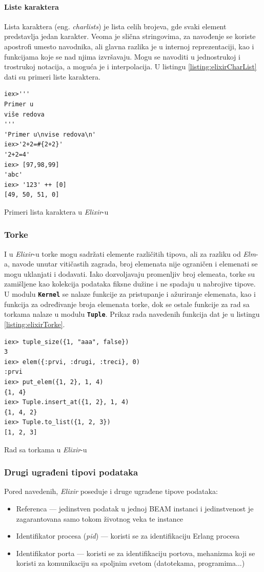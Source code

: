 \documentclass[12pt,oneside]{memoir}
\begin{document}
\paragraph{Liste karaktera }
Lista karaktera (eng. \emph{charlists}) je lista celih brojeva, gde svaki element predstavlja jedan karakter.
Veoma je slična stringovima, za navođenje se koriste apostrofi umesto navodnika, 
ali glavna razlika je u internoj reprezentaciji, kao i funkcijama koje se nad njima
izvršavaju. Mogu se navoditi u jednostrukoj i trostrukoj notacija, a moguća je i 
interpolacija. U listingu \ref{listing:elixirCharList} dati su primeri liste karaktera.
\begin{listing}[h]
\begin{verbatim}
iex>'''
Primer u
više redova
'''
'Primer u\nvise redova\n'
iex>'2+2=#{2+2}'
'2+2=4'
iex> [97,98,99]
'abc'
iex> '123' ++ [0] 
[49, 50, 51, 0]
\end{verbatim}
\caption{Primeri lista karaktera u \emph{Elixir}-u}
\label{listing:elixirCharList}
\end{listing}

\subsubsection{Torke}
I u \emph{Elixir}-u torke mogu sadržati elemente različitih tipova, ali za razliku od \emph{Elm}-a,
navode unutar vitičastih zagrada, broj elemenata nije ograničen i elemenati se mogu uklanjati
i dodavati. Iako dozvoljavaju promenljiv broj elemeata, torke su zamišljene kao kolekcija
podataka fiksne dužine i ne spadaju u nabrojive tipove. U modulu \texttt{\textbf{Kernel}}
se nalaze funkcije za pristupanje i ažuriranje elemenata, kao i funkcija za određivanje broja
elemenata torke, dok se ostale funkcije za rad sa torkama nalaze u modulu \texttt{\textbf{Tuple}}.
Prikaz rada navedenih funkcija dat je u listingu \ref{listing:elixirTorke}.
\begin{listing}[!h]
\begin{verbatim}
iex> tuple_size({1, "aaa", false})
3
iex> elem({:prvi, :drugi, :treci}, 0)
:prvi
iex> put_elem({1, 2}, 1, 4)
{1, 4}
iex> Tuple.insert_at({1, 2}, 1, 4)
{1, 4, 2}
iex> Tuple.to_list({1, 2, 3})
[1, 2, 3]
\end{verbatim}
\caption{Rad sa torkama u \emph{Elixir}-u}
\label{listing:elixirTorke}
\end{listing}
\subsubsection{Drugi ugrađeni tipovi podataka}
Pored navedenih, \emph{Elixir} poseduje i druge ugrađene tipove podataka:
\begin{itemize}
  \item Referenca --- jedinstven podatak u jednoj BEAM instanci i jedinstvenost je
  zagarantovana samo tokom životnog veka te instance
  \item Identifikator procesa (\emph{pid}) --- koristi se za identifikaciju Erlang procesa
  \item Identifikator porta --- koristi se za identifikaciju portova, mehanizma koji se
  koristi za komunikaciju sa spoljnim svetom (datotekama, programima...)
\end{itemize} 
\end{document}
